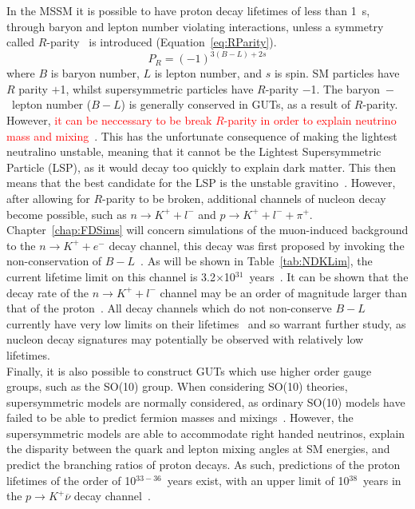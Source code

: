 In the MSSM it is possible to have proton decay lifetimes of less than 1~s, through baryon and lepton number violating interactions, unless a symmetry called $R$-parity~\citep{FARRAR1978575} is introduced (Equation~\ref{eq:RParity}).
\begin{equation}
  \label{eq:RParity}
  P_{R} = (-1)^{3(B-L)+2s}
\end{equation}
where $B$ is baryon number, $L$ is lepton number, and $s$ is spin. SM particles have $R$ parity $+$1, whilst supersymmetric particles have $R$-parity $-$1. The baryon~$-$~lepton number ($B-L$) is generally conserved in GUTs, as a result of $R$-parity. However, \textcolor{red}{it can be neccessary to be break $R$-parity in order to explain neutrino mass and mixing~\citep{Senjanovic:2009kr}}. This has the unfortunate consequence of making the lightest neutralino unstable, meaning that it cannot be the Lightest Supersymmetric Particle (LSP), as it would decay too quickly to explain dark matter. This then means that the best candidate for the LSP is the unstable gravitino~\citep{Senjanovic:2009kr}. However, after allowing for $R$-parity to be broken, additional channels of nucleon decay become possible, such as $n \rightarrow K^{+} + l^{-}$ and $p \rightarrow K^{+} + l^{-} + \pi^{+}$. Chapter~\ref{chap:FDSims} will concern simulations of the muon-induced background to the $n \rightarrow K^{+} + e^{-}$ decay channel, this decay was first proposed by invoking the non-conservation of $B-L$~\citep{PATI1983330, PhysRevLett.44.1316}. As will be shown in Table~\ref{tab:NDKLim}, the current lifetime limit on this channel is 3.2$\times$10$^{31}$~years~\citep{berger:in2p3-00015565}. It can be shown that the decay rate of the $n \rightarrow K^{+} + l^{-}$ channel may be an order of magnitude larger than that of the proton~\citep{Senjanovic:2009kr, Vissani:1995hp}. All decay channels which do not non-conserve $B-L$ currently have very low limits on their lifetimes~\citep{PDGReview} and so warrant further study, as nucleon decay signatures may potentially be observed with relatively low lifetimes. \\

Finally, it is also possible to construct GUTs which use higher order gauge groups, such as the SO(10) group. When considering SO(10) theories, supersymmetric models are normally considered, as ordinary SO(10) models have failed to be able to predict fermion masses and mixings~\citep{Senjanovic:2009kr}. However, the supersymmetric models are able to accommodate right handed neutrinos, explain the disparity between the quark and lepton mixing angles at SM energies, and predict the branching ratios of proton decays. As such, predictions of the proton lifetimes of the order of 10$^{33-36}$~years exist, with an upper limit of 10$^{38}$~years in the $p \rightarrow K^{+} \overline{\nu}$ decay channel~\citep{Severson:2015dta}. \\

